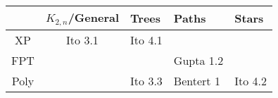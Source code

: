 
\renewcommand{\arraystretch}{1.3}
\begin{tabularx}{\textwidth}{|c||c|Y|Y|Y|}
	\hline

	&
	$K_{2,n}$/General &
	Trees &
	Paths &
	Stars \\

	\hline
	\hline

	XP &
	 Ito 3.1 &
	 Ito 4.1 &
	 &
	 \\

	\hline

	FPT &
	 &
	 &
	 Gupta 1.2 &
	 \\

	\hline

	Poly &
	 &
	 Ito 3.3 &
	 Bentert 1 &
	 Ito 4.2 \\

	\hline
\end{tabularx}
\renewcommand{\arraystretch}{1}
